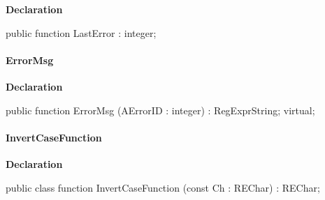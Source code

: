 \documentclass{report}
\newif\ifpdf
\begin{document}
\label{RegExpr.TRegExpr-LastError}
\begin{list}{}{
\setlength{\itemindent}{0cm}
\setlength{\listparindent}{0cm}
\setlength{\leftmargin}{\evensidemargin}
\addtolength{\leftmargin}{\tmplength}
\settowidth{\labelsep}{X}
\addtolength{\leftmargin}{\labelsep}
\setlength{\labelwidth}{\tmplength}
}
\item[\textbf{Declaration}\hfill]
\ifpdf
\begin{flushleft}
\fi
\begin{ttfamily}
public function LastError : integer;\end{ttfamily}

\ifpdf
\end{flushleft}
\fi

\end{list}
\paragraph*{ErrorMsg}\hspace*{\fill}

\label{RegExpr.TRegExpr-ErrorMsg}
\begin{list}{}{
\setlength{\itemindent}{0cm}
\setlength{\listparindent}{0cm}
\setlength{\leftmargin}{\evensidemargin}
\addtolength{\leftmargin}{\tmplength}
\settowidth{\labelsep}{X}
\addtolength{\leftmargin}{\labelsep}
\setlength{\labelwidth}{\tmplength}
}
\item[\textbf{Declaration}\hfill]
\ifpdf
\begin{flushleft}
\fi
\begin{ttfamily}
public function ErrorMsg (AErrorID : integer) : RegExprString; virtual;\end{ttfamily}

\ifpdf
\end{flushleft}
\fi

\end{list}
\paragraph*{InvertCaseFunction}\hspace*{\fill}

\label{RegExpr.TRegExpr-InvertCaseFunction}
\begin{list}{}{
\setlength{\itemindent}{0cm}
\setlength{\listparindent}{0cm}
\setlength{\leftmargin}{\evensidemargin}
\addtolength{\leftmargin}{\tmplength}
\settowidth{\labelsep}{X}
\addtolength{\leftmargin}{\labelsep}
\setlength{\labelwidth}{\tmplength}
}
\item[\textbf{Declaration}\hfill]
\ifpdf
\begin{flushleft}
\fi
\begin{ttfamily}
public class function InvertCaseFunction (const Ch : REChar) : REChar;\end{ttfamily}

\ifpdf
\end{flushleft}
\fi

\end{list}
\end{document}
